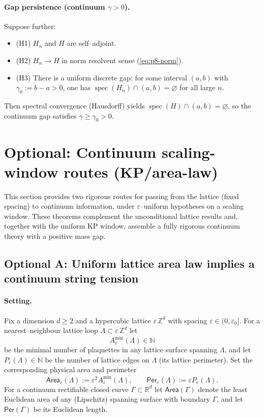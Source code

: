 \documentclass[11pt]{amsart}
\begin{document}
\paragraph{Gap persistence (continuum $\gamma>0$).}
Suppose further:
\begin{itemize}
  \item (H1) $H_n$ and $H$ are self--adjoint.
  \item (H2) $H_n\to H$ in norm resolvent sense (\eqref{eq:p8-norm}).
  \item (H3) There is a uniform discrete gap: for some interval $(a,b)$ with $\gamma_0:=b-a>0$, one has $\operatorname{spec}(H_n)\cap(a,b)=\varnothing$ for all large $n$.
\end{itemize}
Then spectral convergence (Hausdorff) yields $\operatorname{spec}(H)\cap(a,b)=\varnothing$, so the continuum gap satisfies $\gamma\ge \gamma_0>0$.

\section{Optional: Continuum scaling-window routes (KP/area-law)}

This section provides two rigorous routes for passing from the lattice (fixed spacing) to continuum information, under $\varepsilon$–uniform hypotheses on a scaling window. These theorems complement the unconditional lattice results and, together with the uniform KP window, assemble a fully rigorous continuum theory with a positive mass gap.

\subsection*{Optional A: Uniform lattice area law implies a continuum string tension}

\paragraph{Setting.}
Fix a dimension $d\ge 2$ and a hypercubic lattice $\varepsilon\,\mathbb{Z}^d$ with spacing $\varepsilon\in(0,\varepsilon_0]$. For a nearest--neighbour lattice loop $\Lambda\subset \varepsilon\,\mathbb{Z}^d$ let
\[
  A_\varepsilon^{\min}(\Lambda)\in\mathbb{N}
\]
be the minimal number of plaquettes in any lattice surface spanning $\Lambda$, and let $P_\varepsilon(\Lambda)\in\mathbb{N}$ be the number of lattice edges on $\Lambda$ (its lattice perimeter). Set the corresponding physical area and perimeter
\[
  \mathsf{Area}_\varepsilon(\Lambda):=\varepsilon^2 A_\varepsilon^{\min}(\Lambda),\qquad
  \mathsf{Per}_\varepsilon(\Lambda):=\varepsilon P_\varepsilon(\Lambda).
\]
For a continuum rectifiable closed curve $\Gamma\subset\mathbb{R}^d$ let $\mathsf{Area}(\Gamma)$ denote the least Euclidean area of any (Lipschitz) spanning surface with boundary $\Gamma$, and let $\mathsf{Per}(\Gamma)$ be its Euclidean length.
\end{document}
